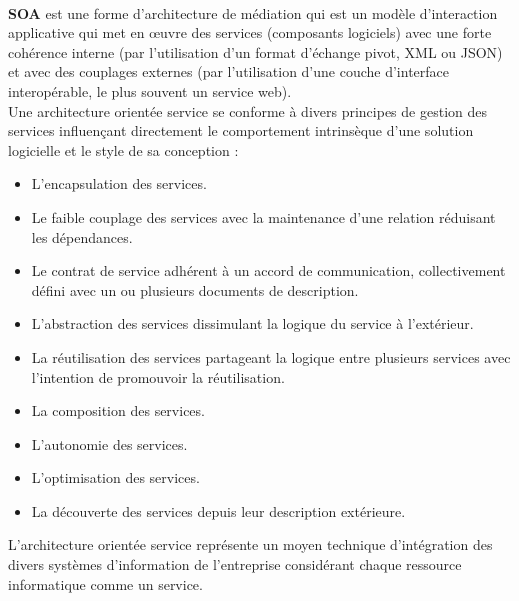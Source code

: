 \documentclass[12pt]{report}
\begin{document}
	  \paragraph{}
	    \textbf{\gls{SOA}} est une forme d'architecture de médiation qui est un modèle d'interaction applicative qui met en œuvre des services (composants logiciels) avec une forte cohérence interne (par l'utilisation d'un format d'échange pivot, XML ou JSON) et avec des couplages externes (par l'utilisation d'une couche d'interface interopérable, le plus souvent un service web).
	    \\Une architecture orientée service se conforme à divers principes de gestion des services influençant directement le comportement intrinsèque d’une solution logicielle et le style de sa conception :
	      \begin{itemize}
		\item L’encapsulation des services.
		\item Le faible couplage des services avec la maintenance d’une relation réduisant les dépendances.
		\item Le contrat de service adhérent à un accord de communication, collectivement défini avec un ou plusieurs documents de description.
		\item L’abstraction des services dissimulant la logique du service à l’extérieur.
		\item La réutilisation des services partageant la logique entre plusieurs services avec l’intention de promouvoir la réutilisation.
		\item La composition des services.
		\item L’autonomie des services.
		\item L’optimisation des services.
		\item La découverte des services depuis leur description extérieure.
	      \end{itemize}
	      L’architecture orientée service représente un moyen technique d’intégration des divers systèmes d’information de l’entreprise considérant chaque ressource informatique comme un service.
	      
\end{document}
